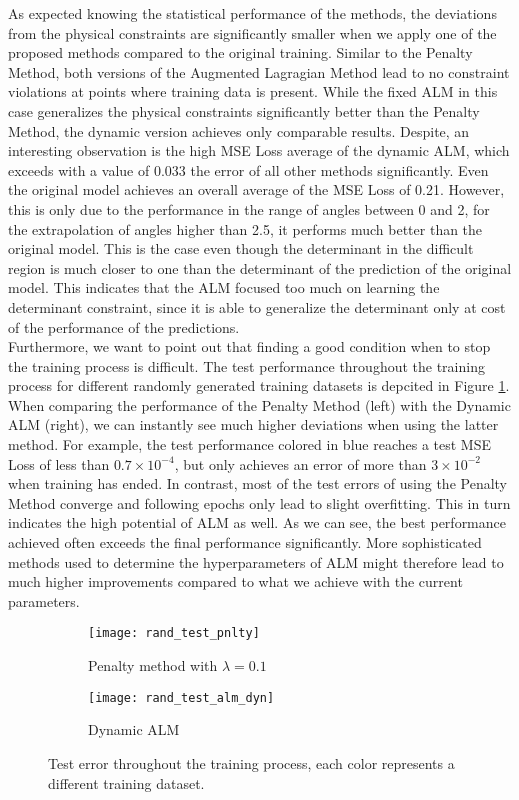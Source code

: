 As expected knowing the statistical performance of the methods, the deviations from the physical constraints are significantly smaller when we apply one of the proposed methods compared to the original training. Similar to the Penalty Method, both versions of the Augmented Lagragian Method lead to no constraint violations at points where training data is present. While the fixed ALM in this case generalizes the physical constraints significantly better than the Penalty Method, the dynamic version achieves only comparable results. Despite, an interesting observation is the high MSE Loss average of the dynamic ALM, which exceeds with a value of 0.033 the error of all other methods significantly. Even the original model achieves an overall average of the MSE Loss of 0.21. However, this is only due to the performance in the range of angles between 0 and 2, for the extrapolation of angles higher than 2.5, it performs much better than the original model. This is the case even though the determinant in the difficult region is much closer to one than the determinant of the prediction of the original model. This indicates that the ALM focused too much on learning the determinant constraint, since it is able to generalize the determinant only at cost of the performance of the predictions.\\
\indent Furthermore, we want to point out that finding a good condition when to stop the training process is difficult. The test performance throughout the training process for different randomly generated training datasets is depcited in Figure \ref{fig:test_training}. When comparing the performance of the Penalty Method (left) with the Dynamic ALM (right), we can instantly see much higher deviations when using the latter method. For example, the test performance colored in blue reaches a test MSE Loss of less than $0.7\times 10^{-4}$, but only achieves an error of more than $3\times 10^{-2}$ when training has ended. In contrast, most of the test errors of using the Penalty Method converge and following epochs only lead to slight overfitting. This in turn indicates the high potential of ALM as well. As we can see, the best performance achieved often exceeds the final performance significantly. More sophisticated methods used to determine the hyperparameters of ALM  might therefore lead to much higher improvements compared to what we achieve with the current parameters.
\begin{figure}
	\centering
	\begin{subfigure}{.5\textwidth}
		\centering
		\texttt{[image: rand\_test\_pnlty]}
		\caption{Penalty method with $\lambda = 0.1$}
	\end{subfigure}%
	\begin{subfigure}{.5\textwidth}
		\centering
		\texttt{[image: rand\_test\_alm\_dyn]}
		\caption{Dynamic ALM}
	\end{subfigure}
	\caption{Test error throughout the training process, each color represents a different training dataset.}
	\label{fig:test_training}
\end{figure}





\clearpage

